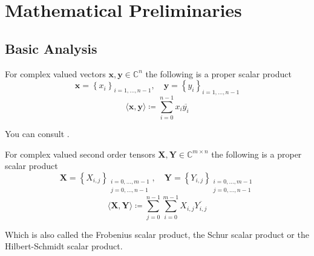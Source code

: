 \chapter{Mathematical Preliminaries}
\section{Basic Analysis}
\begin{Prop}
    For complex valued vectors $\boldsymbol{x},\boldsymbol{y} \in \mathbb{C}^n$ the following is a proper scalar product
    \begin{equation*}
        \boldsymbol{x} = \left\{x_i\right\}_{i=1,\ldots,n-1}, \quad \boldsymbol{y} = \left\{y_i\right\}_{i=1,\ldots,n-1}
    \end{equation*}
    \begin{equation*}
        \langle\boldsymbol{x},\boldsymbol{y}\rangle \coloneqq \sum_{i=0}^{n-1} x_i \overline{y_i} 
    \end{equation*}
\end{Prop}
\begin{Proof}
    You can consult \cite{Frazier1999}\cite{Horn2012} \cite{Hackbusch2019}.
\end{Proof}
\begin{Prop}
    For complex valued second order tensors $\boldsymbol{X},\boldsymbol{Y} \in \mathbb{C}^{m \times n}$ the following is a proper scalar product
    \begin{equation*}
        \boldsymbol{X} = \left\{X_{i,j}\right\}_{\substack{i=0,\ldots,m-1\\ j=0,\ldots,n-1}}, \quad \boldsymbol{Y} = \left\{Y_{i,j}\right\}_{\substack{i=0,\ldots,m-1\\ j=0,\ldots,n-1}}
    \end{equation*}
    \begin{equation*}
        \langle\boldsymbol{X},\boldsymbol{Y}\rangle \coloneqq \sum_{j=0}^{n-1}\sum_{i=0}^{m-1} X_{i,j} \overline{Y_{i,j}} 
    \end{equation*}
\end{Prop}

Which is also called the Frobenius scalar product, the Schur scalar product or 
the Hilbert-Schmidt scalar product.

